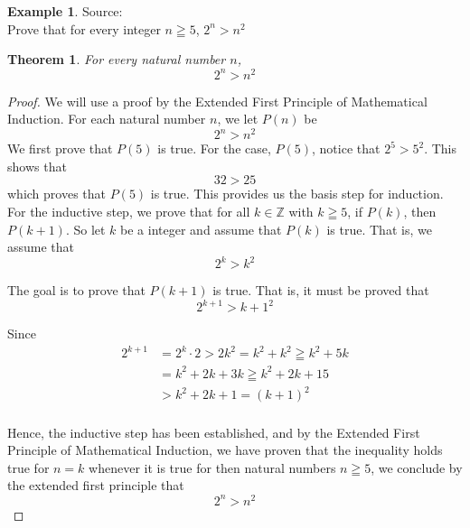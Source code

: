 \documentclass{book}
\newtheorem{theorem}{Theorem}[section]
\theoremstyle{definition}
\newtheorem{example}{Example}[definition]
\theoremstyle{remark}
\newcommand{\bb}[1]{\mathbb{#1}}
\newcommand{\m}{\cdot}
\begin{document}
\newpage
\begin{example}
Source: \cite[Chap.6, S.6.2, Result 6.10]{gray} \\ 

Prove that for every integer $n \geqq 5$, $2^n > n^2$ 
\begin{tcolorbox}
    \begin{theorem}
        For every natural number $n$,
        \begin{equation*}
            2^n > n^2              
        \end{equation*}
    \end{theorem}
\end{tcolorbox}

\begin{proof}
    We will use a proof by the Extended First Principle of Mathematical Induction. For each natural number $n$, we let $P(n)$ be
        \begin{equation*}
            2^n > n^2
        \end{equation*}
    We first prove that $P(5)$ is true. For the case, $P(5)$, notice that $2^5 > 5^2$. This shows that   
        \begin{equation*}
            32 > 25
        \end{equation*}
    which proves that $P(5)$ is true. This provides us the basis step for induction. \\ 
    
    For the inductive step, we prove that for all $k \in \bb{Z}$ with $k \geqq 5$, if $P(k)$, then $P(k+1)$. So let $k$ be a integer and assume that $P(k)$ is true. That is, we assume that 
        \begin{equation*}
           2^k > k^2
        \end{equation*}
    
    The goal is to prove that $P(k+1)$ is true. That is, it must be proved that  
        \begin{equation*}
           2^{k+1} > {k+1}^2
        \end{equation*}
    
    Since
        \begin{align*}
            2^{k+1} & = 2^k \m 2 > 2k^2 = k^2 + k^2 \geqq k^2 + 5k \\
                & = k^2 + 2k + 3k \geqq k^2 + 2k + 15 \\
                & > k^2 + 2k + 1 = (k+1)^2 \\
        \end{align*}
    
    Hence, the inductive step has been established, and by the Extended First Principle of Mathematical Induction, we have proven that the inequality holds true for $n=k$ whenever it is true for then natural numbers $n \geqq 5$, we conclude by the extended first principle that
        \begin{equation*}
            2^n > n^2
        \end{equation*}
 
\end{proof}
\end{example}
\end{document}

